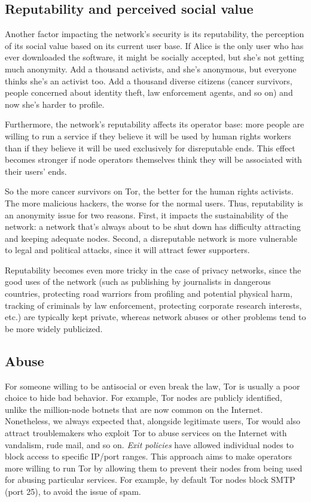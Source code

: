 \documentclass{llncs}
\begin{document}
\subsection{Reputability and perceived social value}
Another factor impacting the network's security is its reputability,
the perception of its social value based on its current user base. If
Alice is the only user who has ever downloaded the software, it might
be socially accepted, but she's not getting much anonymity. Add a
thousand activists, and she's anonymous, but everyone thinks she's an
activist too.  Add a thousand diverse citizens (cancer survivors,
people concerned about identity theft, law enforcement agents, and so
on) and now she's harder to profile.

Furthermore, the network's reputability affects its operator base:
more people are willing to run a service if they believe it will be
used by human rights workers than if they believe it will be used
exclusively for disreputable ends.  This effect becomes stronger if
node operators themselves think they will be associated with their
users' ends.

So the more cancer survivors on Tor, the better for the human rights
activists. The more malicious hackers, the worse for the normal
users. Thus, reputability is an anonymity issue for two
reasons. First, it impacts the sustainability of the network: a
network that's always about to be shut down has difficulty attracting
and keeping adequate nodes.  Second, a disreputable network is more
vulnerable to legal and political attacks, since it will attract fewer
supporters.

Reputability becomes even more tricky in the case of privacy networks,
since the good uses of the network (such as publishing by journalists
in dangerous countries, protecting road warriors from profiling and
potential physical harm, tracking of criminals by law enforcement,
protecting corporate research interests, etc.) are typically kept private,
whereas network abuses or other problems tend to be more widely
publicized.


\subsection{Abuse}
\label{subsec:tor-and-blacklists}

For someone willing to be antisocial or even break the law, Tor is
usually a poor choice to hide bad behavior. For example, Tor nodes are
publicly identified, unlike the million-node botnets that are now
common on the Internet. Nonetheless, we always expected that,
alongside legitimate users, Tor would also attract troublemakers who
exploit Tor to abuse services on the Internet with vandalism, rude
mail, and so on.  \emph{Exit policies} have allowed individual nodes
to block access to specific IP/port ranges.  This approach aims to
make operators more willing to run Tor by allowing them to prevent
their nodes from being used for abusing particular services.  For
example, by default Tor nodes block SMTP (port 25), to avoid the issue
of spam.
\end{document}
